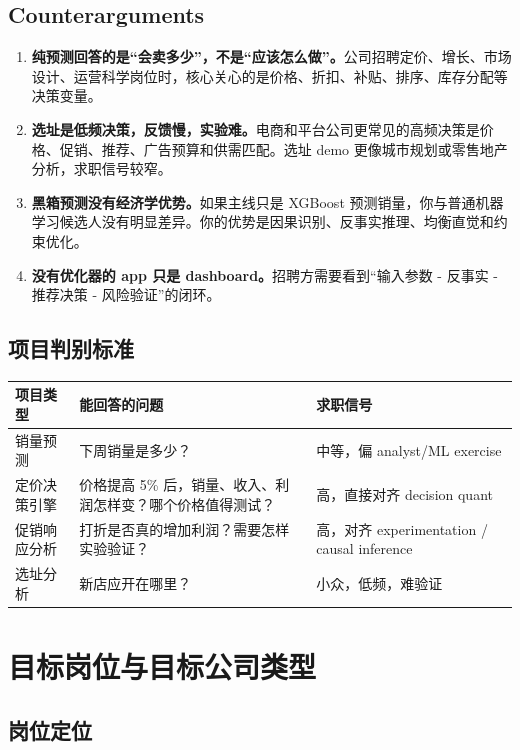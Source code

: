 \documentclass[UTF8,11pt,a4paper,fontset=none]{ctexart}
\begin{document}
\subsection{Counterarguments}

\begin{enumerate}
  \item \textbf{纯预测回答的是“会卖多少”，不是“应该怎么做”。}公司招聘定价、增长、市场设计、运营科学岗位时，核心关心的是价格、折扣、补贴、排序、库存分配等决策变量。
  \item \textbf{选址是低频决策，反馈慢，实验难。}电商和平台公司更常见的高频决策是价格、促销、推荐、广告预算和供需匹配。选址 demo 更像城市规划或零售地产分析，求职信号较窄。
  \item \textbf{黑箱预测没有经济学优势。}如果主线只是 XGBoost 预测销量，你与普通机器学习候选人没有明显差异。你的优势是因果识别、反事实推理、均衡直觉和约束优化。
  \item \textbf{没有优化器的 app 只是 dashboard。}招聘方需要看到“输入参数 - 反事实 - 推荐决策 - 风险验证”的闭环。
\end{enumerate}

\subsection{项目判别标准}

\begin{tabularx}{\textwidth}{L{4.0cm}Y Y}
\toprule
项目类型 & 能回答的问题 & 求职信号 \\
\midrule
销量预测 & 下周销量是多少？ & 中等，偏 analyst/ML exercise \\
定价决策引擎 & 价格提高 5\% 后，销量、收入、利润怎样变？哪个价格值得测试？ & 高，直接对齐 decision quant \\
促销响应分析 & 打折是否真的增加利润？需要怎样实验验证？ & 高，对齐 experimentation / causal inference \\
选址分析 & 新店应开在哪里？ & 小众，低频，难验证 \\
\bottomrule
\end{tabularx}

\section{目标岗位与目标公司类型}

\subsection{岗位定位}
\end{document}
